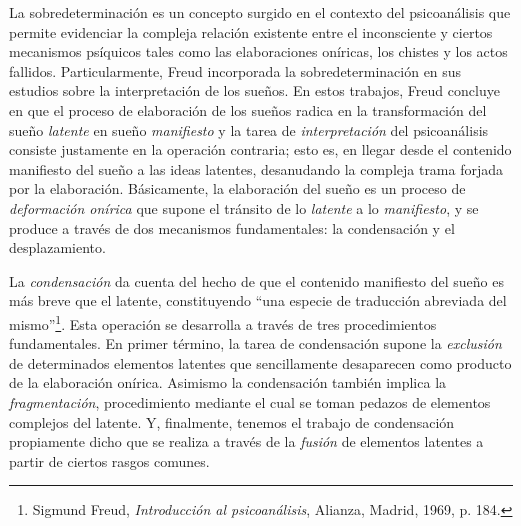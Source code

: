 La sobredeterminación es un concepto surgido en el contexto del
psicoanálisis que permite evidenciar la compleja relación existente
entre el inconsciente y ciertos mecanismos psíquicos tales como las
elaboraciones oníricas, los chistes y los actos fallidos.
Particularmente, Freud incorporada la sobredeterminación en sus estudios
sobre la interpretación de los sueños. En estos trabajos, Freud concluye
en que el proceso de elaboración de los sueños radica en la
transformación del sueño \emph{latente} en sueño \emph{manifiesto} y la
tarea de \emph{interpretación} del psicoanálisis consiste justamente en
la operación contraria; esto es, en llegar desde el contenido manifiesto
del sueño a las ideas latentes, desanudando la compleja trama forjada
por la elaboración. Básicamente, la elaboración del sueño es un proceso
de \emph{deformación onírica} que supone el tránsito de lo
\emph{latente} a lo \emph{manifiesto}, y se produce a través de dos
mecanismos fundamentales: la condensación y el desplazamiento.

La \emph{condensación} da cuenta del hecho de que el contenido
manifiesto del sueño es más breve que el latente, constituyendo \enquote{una
especie de traducción abreviada del mismo}\footnote{Sigmund Freud,
  \emph{Introducción al psicoanálisis}, Alianza, Madrid, 1969, p. 184.}.
Esta operación se desarrolla a través de tres procedimientos
fundamentales. En primer término, la tarea de condensación supone la
\emph{exclusión} de determinados elementos latentes que sencillamente
desaparecen como producto de la elaboración onírica. Asimismo la
condensación también implica la \emph{fragmentación}, procedimiento
mediante el cual se toman pedazos de elementos complejos del latente. Y,
finalmente, tenemos el trabajo de condensación propiamente dicho que se
realiza a través de la \emph{fusión} de elementos latentes a partir de
ciertos rasgos comunes.

